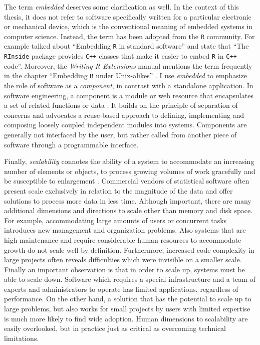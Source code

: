 The term \emph{embedded} deserves some clarification as well. In the context of this thesis, it does not refer to software specifically written for a particular electronic or mechanical device, which is the conventional meaning of embedded systems in computer science. Instead, the term has been adopted from the \texttt{R} community. For example \cite{neuwirth2001embedding} talked about ``Embedding \texttt{R} in standard software'' and \cite{eddelbuettel2011rcpp} state that ``The \texttt{RInside} package provides \texttt{C++} classes that make it easier to embed \texttt{R} in \texttt{C++} code''. Moreover, the \emph{Writing R Extensions} manual mentions the term frequently in the chapter ``Embedding \texttt{R} under Unix-alikes'' \citep{writingextensions}. I use \emph{embedded} to emphasize the role of software as a \emph{component}, in contrast with a standalone application. In software engineering, a component is a module or web resource that encapsulates a set of related functions or data \citep{cox1990planning}. It builds on the principle of separation of concerns and advocates a reuse-based approach to defining, implementing and composing loosely coupled independent modules into systems. Components are generally not interfaced by the user, but rather called from another piece of software through a programmable interface. %

Finally, \emph{scalability} connotes the ability of a system to accommodate an increasing number of elements or objects, to process growing volumes of work gracefully and be susceptible to enlargement \citep{bondi2000characteristics}. Commercial vendors of statistical software often present scale exclusively in relation to the magnitude of the data and offer solutions to process more data in less time. Although important, there are many additional dimensions and directions to scale other than memory and disk space. For example, accommodating large amounts of users or concurrent tasks introduces new management and organization problems. Also systems that are high maintenance and require considerable human resources to accommodate growth do not scale well by definition. Furthermore, increased code complexity in large projects often reveals difficulties which were invisible on a smaller scale. Finally an important observation is that in order to scale up, systems must be able to scale down. Software which requires a special infrastructure and a team of experts and administrators to operate has limited applications, regardless of performance. On the other hand, a solution that has the potential to scale up to large problems, but also works for small projects by users with limited expertise is much more likely to find wide adoption. Human dimensions to scalability are easily overlooked, but in practice just as critical as overcoming technical limitations.

